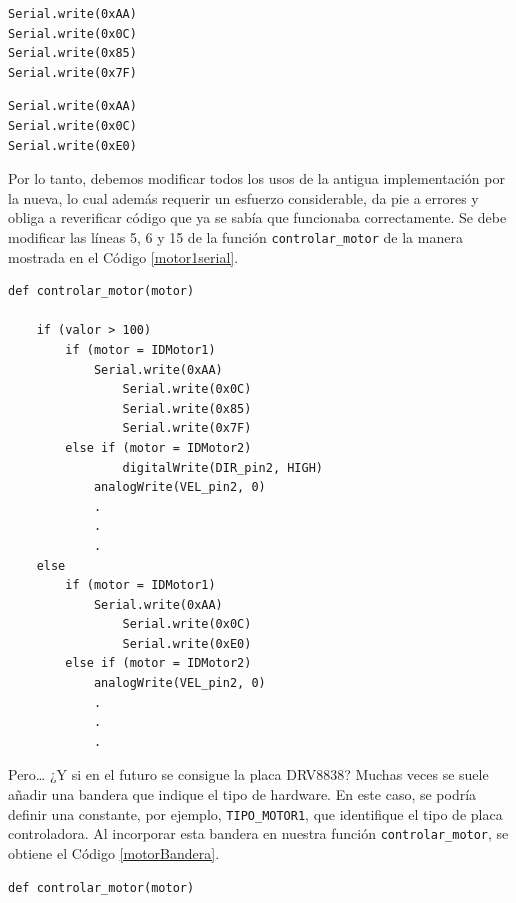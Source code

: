 \begin{itemize}
\begin{lstlisting}[caption=Configuración de la placa de control del motor DC utiliza comunicación serie., label={listingDistinto}]
    \end{lstlisting}
\begin{lstlisting}[caption=Establecer máxima velocidad giro horario para el caso de comunicación en serie., label={maxSerial}]
Serial.write(0xAA)
Serial.write(0x0C)
Serial.write(0x85)
Serial.write(0x7F)
\end{lstlisting}
\begin{lstlisting}[caption=Establecer detención para el caso de comunicación en serie., label={detSerial}]
Serial.write(0xAA)
Serial.write(0x0C)
Serial.write(0xE0)
\end{lstlisting}
Por lo tanto, debemos modificar todos los usos de la antigua implementación por la nueva, lo cual además requerir un esfuerzo considerable, da pie a errores y obliga a reverificar código que ya se sabía que funcionaba correctamente. Se debe modificar las líneas 5, 6 y 15 de la función \verb|controlar_motor| de la manera mostrada en el Código \ref{motor1serial}.

\begin{lstlisting}[caption=Modificación de la función controlar\_motor para utilizar placa de control serial para controlar el motor 1.,label={motor1serial}]
def controlar_motor(motor)

	if (valor > 100)
		if (motor = IDMotor1)
    		Serial.write(0xAA)
				Serial.write(0x0C)
				Serial.write(0x85)
				Serial.write(0x7F)
		else if (motor = IDMotor2)
				digitalWrite(DIR_pin2, HIGH)
	    	analogWrite(VEL_pin2, 0)
	    	.
	    	.
	    	.
	else
		if (motor = IDMotor1)
	    	Serial.write(0xAA)
				Serial.write(0x0C)
				Serial.write(0xE0)
		else if (motor = IDMotor2)
	    	analogWrite(VEL_pin2, 0)
	    	.
	    	.
	    	.

\end{lstlisting}

Pero… ¿Y si en el futuro se consigue la placa \gls{DRV8838}? Muchas veces se suele añadir una bandera que indique el tipo de hardware. En este caso, se podría definir una constante, por ejemplo, \verb|TIPO_MOTOR1|, que identifique el tipo de placa controladora. Al incorporar esta bandera en nuestra función \verb|controlar_motor|, se obtiene el Código \ref{motorBandera}.

\begin{lstlisting}[caption=Modificación de la función controlar\_motor para utilizar bandera indicadora de tipo de placa controladora.,label={motorBandera}]
def controlar_motor(motor)


\end{lstlisting}
\end{itemize}
